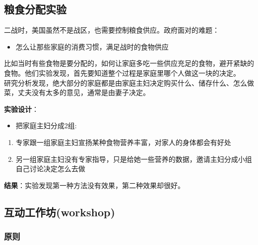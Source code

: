 \hypertarget{ux7caeux98dfux5206ux914dux5b9eux9a8c}{%
\subsection{粮食分配实验}\label{ux7caeux98dfux5206ux914dux5b9eux9a8c}}

二战时，美国虽然不是战区，也需要控制粮食供应。政府面对的难题：

\begin{itemize}
\tightlist
\item
  怎么让那些家庭的消费习惯，满足战时的食物供应\\
\end{itemize}

比如当时有些食物是要分配的，如何让家庭多吃一些供应充足的食物，避开紧缺的食物。他们实验发现，首先要知道整个过程是家庭里哪个人做这一块的决定。\\
研究分析发现，绝大部分的家庭都是由家庭主妇决定购买什么、储存什么、怎么做菜，丈夫没有太多的意见，通常是由妻子决定。

\textbf{实验设计}：

\begin{itemize}
\tightlist
\item
  把家庭主妇分成2组:
\end{itemize}

\begin{enumerate}
\tightlist
\item
  专家跟一组家庭主妇宣扬某种食物营养丰富，对家人的身体都会有好处
\item
  另一组家庭主妇没有专家指导，只是给她一些营养的数据，邀请主妇分成小组自己讨论决定怎么去做\\
\end{enumerate}

\textbf{结果}：实验发现第一种方法没有效果，第二种效果却很好。

\hypertarget{ux4e92ux52a8ux5de5ux4f5cux574aworkshop}{%
\subsection{互动工作坊(workshop)}\label{ux4e92ux52a8ux5de5ux4f5cux574aworkshop}}

\hypertarget{ux539fux5219}{%
\subsubsection{原则}\label{ux539fux5219}}

